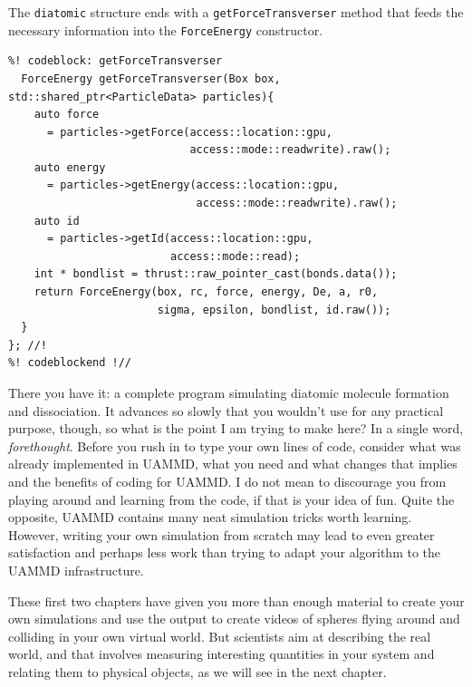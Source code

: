 The \texttt{diatomic} structure ends with a \texttt{getForceTransverser} method 
that feeds the necessary information into the \texttt{ForceEnergy} constructor.
\begin{lstlisting}
%! codeblock: getForceTransverser
  ForceEnergy getForceTransverser(Box box, std::shared_ptr<ParticleData> particles){
    auto force
      = particles->getForce(access::location::gpu,
                            access::mode::readwrite).raw();
    auto energy
      = particles->getEnergy(access::location::gpu,
                             access::mode::readwrite).raw();
    auto id
      = particles->getId(access::location::gpu,
                         access::mode::read);
    int * bondlist = thrust::raw_pointer_cast(bonds.data());
    return ForceEnergy(box, rc, force, energy, De, a, r0,
                       sigma, epsilon, bondlist, id.raw());
  }
}; //!
%! codeblockend !//
\end{lstlisting}

There you have it: a complete program simulating diatomic molecule formation and 
dissociation. It advances so slowly that you wouldn't use for any practical 
purpose, though, so what is the point I am trying to make here? In a single 
word, \textit{forethought}. Before you rush in to type your own lines of code, 
consider what was already implemented in UAMMD, what you need and what changes 
that implies and the benefits of coding for UAMMD. I do not mean to discourage 
you from playing around and learning from the code, if that is your idea of fun. 
Quite the opposite, UAMMD contains many neat simulation tricks worth learning. 
However, writing your own simulation from scratch may lead to even greater 
satisfaction and perhaps less work than trying to adapt your algorithm to the 
UAMMD infrastructure.

\bigbreak

These first two chapters have given you more than enough material to create your 
own simulations and use the output to create videos of spheres flying around and 
colliding in your own virtual world. But scientists aim at describing the real 
world, and that involves measuring interesting quantities in your system and 
relating them to physical objects, as we will see in the next chapter.

